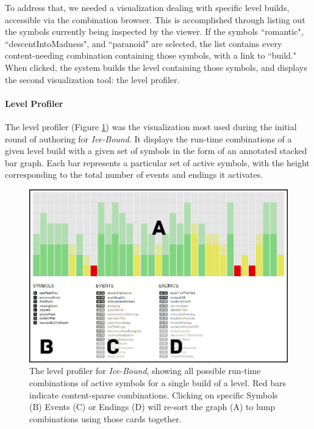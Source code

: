 To address that, we needed a visualization dealing with specific level builds, accessible via the combination browser. This is accomplished through listing out the symbols currently being inspected by the viewer. If the symbols ``romantic", ``descentIntoMadness", and ``paranoid" are selected, the list contains every content-needing combination containing those symbols, with a link to ``build." When clicked, the system builds the level containing those symbols, and displays the second visualization tool: the level profiler.

\paragraph{Level Profiler}\label{par:level-profiler}

The level profiler (Figure \ref{fig:bar-viz}) was the visualization most used during the initial round of authoring for \textit{Ice-Bound}. It displays the run-time combinations of a given level build with a given set of symbols in the form of an annotated stacked bar graph. Each bar represents a particular set of active symbols, with the height corresponding to the total number of events and endings it activates.


\begin{figure}
    \centering
    \includegraphics[width=\textwidth]{figures/2-Ice-Bound/bar-viz.jpg}
    \caption{The level profiler for \textit{Ice-Bound}, showing all possible run-time combinations of active symbols for a single build of a level. Red bars indicate content-sparse combinations. Clicking on specific Symbols (B) Events (C) or Endings (D) will re-sort the graph (A) to lump combinations using those cards together.}
    \label{fig:bar-viz}
\end{figure}

